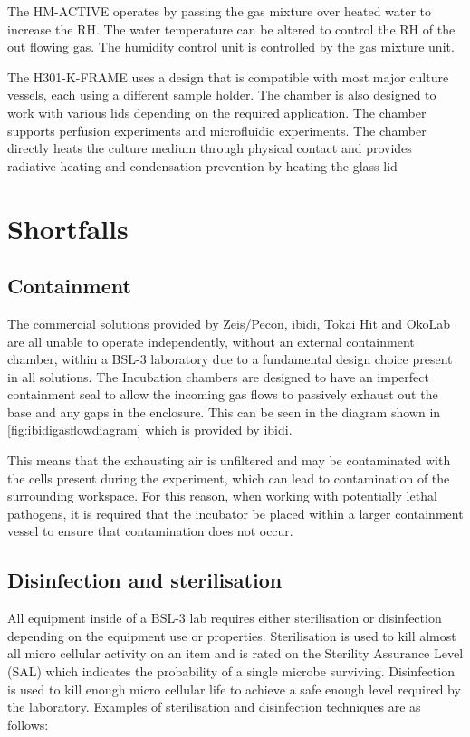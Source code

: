 \documentclass[class=report,11pt,crop=false]{standalone}
\begin{document}
	The HM-ACTIVE\cite{oko-labHMACTIVE_Manual} operates by passing the gas mixture over heated water to increase the RH. The water temperature can be altered to control the RH of the out flowing gas. The humidity control unit is controlled by the gas mixture unit.
	
	The H301-K-FRAME\cite{oko-labH301KFRAME_User_Manual} uses a design that is compatible with most major culture vessels, each using a different sample holder. The chamber is also designed to work with various lids depending on the required application. The chamber supports perfusion experiments and microfluidic experiments. The chamber directly heats the culture medium through physical contact and provides radiative heating and condensation prevention by heating the glass lid

	\section{Shortfalls}
	
	\subsection{Containment}
	The commercial solutions provided by Zeis/Pecon, ibidi, Tokai Hit and OkoLab are all unable to operate independently, without an external containment chamber, within a BSL-3 laboratory due to a fundamental design choice present in all solutions. The Incubation chambers are designed to have an imperfect containment seal to allow the incoming gas flows to passively exhaust out the base and any gaps in the enclosure. This can be seen in the diagram shown in \autoref{fig:ibidigasflowdiagram} which is provided by ibidi.
	
	This means that the exhausting air is unfiltered and may be contaminated with the cells present during the experiment, which can lead to contamination of the surrounding workspace. For this reason, when working with potentially lethal pathogens, it is required that the incubator be placed within a larger containment vessel to ensure that contamination does not occur.
	
	\subsection{Disinfection and sterilisation}
	
	All equipment inside of a BSL-3 lab requires either sterilisation or disinfection depending on the equipment use or properties. Sterilisation is used to kill almost all micro cellular activity on an item and is rated on the Sterility Assurance Level (SAL) which indicates the probability of a single microbe surviving. Disinfection is used to kill enough micro cellular life to achieve a safe enough level required by the laboratory.
	Examples of sterilisation and disinfection techniques are as follows:
	
\end{document}
